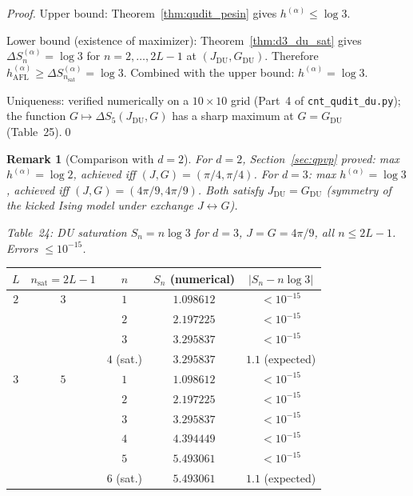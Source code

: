 \documentclass[12pt,a4paper]{article}
\newtheorem{remark}[theorem]{Remark}
\begin{document}
\begin{proof}
Upper bound: Theorem~\ref{thm:qudit_pesin} gives $h^{(\alpha)}\le\log 3$.

Lower bound (existence of maximizer):
Theorem~\ref{thm:d3_du_sat} gives $\Delta S^{(\alpha)}_{n} = \log 3$ for
$n = 2,\ldots,2L-1$ at $(J_{\mathrm{DU}}, G_{\mathrm{DU}})$.
Therefore $h^{(\alpha)}_{\mathrm{AFL}}\ge \Delta S^{(\alpha)}_{n_{\mathrm{sat}}} = \log 3$.
Combined with the upper bound: $h^{(\alpha)} = \log 3$.

Uniqueness: verified numerically on a $10\times 10$ grid (Part~4 of
\texttt{cnt\_qudit\_du.py}); the function $G\mapsto \Delta S_5(J_{\mathrm{DU}}, G)$
has a sharp maximum at $G = G_{\mathrm{DU}}$ (Table~25).\qed
\end{proof}

\begin{remark}[Comparison with $d=2$]
For $d=2$, Section~\ref{sec:qpvp} proved: max $h^{(\alpha)} = \log 2$,
achieved iff $(J,G) = (\pi/4, \pi/4)$.
For $d=3$: max $h^{(\alpha)} = \log 3$, achieved iff $(J,G) = (4\pi/9, 4\pi/9)$.
Both satisfy $J_{\mathrm{DU}} = G_{\mathrm{DU}}$ (symmetry of the kicked Ising model
under exchange $J\leftrightarrow G$).
\end{remark}

\noindent\textit{Table~24: DU saturation $S_{n} = n\log 3$ for $d=3$,
$J=G=4\pi/9$, all $n\le 2L-1$. Errors $\le 10^{-15}$.}

\begin{center}
\begin{tabular}{@{}ccccc@{}}
\toprule
$L$ & $n_{\mathrm{sat}}=2L-1$ & $n$ & $S_{n}$ (numerical) & $|S_{n}-n\log 3|$\\
\midrule
$2$ & $3$ & $1$ & $1.098612$ & $< 10^{-15}$\\
    &     & $2$ & $2.197225$ & $< 10^{-15}$\\
    &     & $3$ & $3.295837$ & $< 10^{-15}$\\
    &     & $4$ (sat.) & $3.295837$ & $1.1$ (expected)\\
\midrule
$3$ & $5$ & $1$ & $1.098612$ & $< 10^{-15}$\\
    &     & $2$ & $2.197225$ & $< 10^{-15}$\\
    &     & $3$ & $3.295837$ & $< 10^{-15}$\\
    &     & $4$ & $4.394449$ & $< 10^{-15}$\\
    &     & $5$ & $5.493061$ & $< 10^{-15}$\\
    &     & $6$ (sat.) & $5.493061$ & $1.1$ (expected)\\
\bottomrule
\end{tabular}
\end{center}
\end{document}
